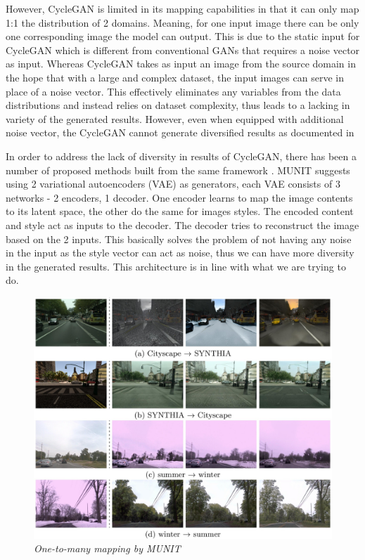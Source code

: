 \documentclass[12pt]{report}
\begin{document}
However, CycleGAN is limited in its mapping capabilities in that it can only map 1:1 the distribution of 2 domains. Meaning, for one input image there can be only one corresponding image the model can output. This is due to the static input for CycleGAN which is different from conventional GANs that requires a noise vector as input. Whereas CycleGAN takes as input an image from the source domain in the hope that with a large and complex dataset, the input images can serve in place of a noise vector. This effectively eliminates any variables from the data distributions and instead relies on dataset complexity, thus leads to a lacking in variety of the generated results. However, even when equipped with additional noise vector, the CycleGAN cannot generate diversified results as documented in \cite{augmented-cyclegan} 

In order to address the lack of diversity in results of CycleGAN, there has been a number of proposed methods built from the same framework \cite{munit}\cite{bicycle-gan}\cite{disco-gan}\cite{bayesian-cyclegan}. MUNIT\cite{munit} suggests using 2 variational autoencoders (VAE) as generators, each VAE consists of 3 networks - 2 encoders, 1 decoder. One encoder learns to map the image contents to its latent space, the other do the same for images styles. The encoded content and style act as inputs to the decoder. The decoder tries to reconstruct the image based on the 2 inputs. This basically solves the problem of not having any noise in the input as the style vector can act as noise, thus we can have more diversity in the generated results. This architecture is in line with what we are trying to do.

\begin{figure}[h]
	\centering
	\includegraphics[scale=0.2]{street-munit}
	\caption{\textit{One-to-many mapping by MUNIT\cite{munit}}}
	\label{fig:street-munit}
\end{figure}
\end{document}
